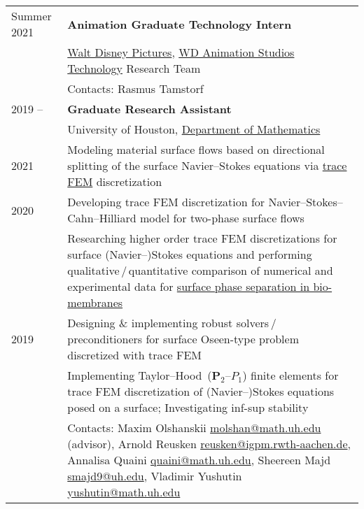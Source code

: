 \documentclass[a4paper,12pt]{article}
\begin{document}
	\begin{longtable}{ l >{\raggedright\arraybackslash}p{15cm} }
		Summer 2021
			& \textbf{Animation Graduate Technology Intern}\vspace{1mm}\\
			& \href{https://www.disney.com/}{Walt Disney Pictures}, \href{https://www.disneyanimation.com/technology/}{WD Animation Studios Technology} Research Team\vspace{1mm}\\
			& Contacts: Rasmus Tamstorf \vspace{3mm}\\
		2019 --
			& \textbf{Graduate Research Assistant}\vspace{1mm}\\
			& University of Houston, \href{http://www.uh.edu/nsm/math/}{Department of Mathematics}\vspace{1mm}\\
		2021 
			& Modeling material surface flows based on directional splitting of the surface Navier--Stokes equations via \href{https://www.math.uh.edu/~molshan/tracefinite.html}{trace FEM} discretization\vspace{1mm}\\
		2020
			& Developing trace FEM discretization for Navier--Stokes--Cahn--Hilliard model for two-phase surface flows\vspace{1mm}\\
			& Researching higher order trace FEM discretizations for surface (Navier--)Stokes equations and performing qualitative\,/\,quantitative comparison of numerical and experimental data for \href{https://www.math.uh.edu/~molshan/material.html}{surface phase separation in bio-membranes}\vspace{1mm}\\
		2019
			& Designing \& implementing robust solvers\,/\,preconditioners for surface Oseen-type problem discretized with trace FEM\vspace{1mm}\\
			& Implementing Taylor--Hood~($\mathbf{P}_2$--$P_1$) finite elements for trace FEM discretization of (Navier--)Stokes equations posed on a surface; Investigating inf-sup stability\vspace{1mm}\\
			& Contacts: Maxim Olshanskii \href{mailto:molshan@math.uh.edu}{molshan@math.uh.edu} (advisor), Arnold Reusken \href{mailto:reusken@igpm.rwth-aachen.de}{reusken@igpm.rwth-aachen.de}, Annalisa Quaini \href{mailto:quaini@math.uh.edu}{quaini@math.uh.edu}, Sheereen Majd \href{mailto:smajd9@uh.edu}{smajd9@uh.edu}, Vladimir Yushutin \href{mailto:yushutin@math.uh.edu}{yushutin@math.uh.edu}\vspace{3mm}\\

\end{longtable}
\end{document}
